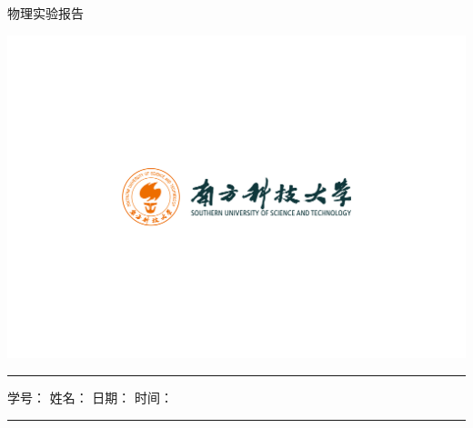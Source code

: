 \documentclass[12pt,a4paper]{article}
\begin{document}
	\doublespacing
	
	
	\noindent
	\hspace{-2em}
	\begin{minipage}[c]{0.65\textwidth}
		\raggedright
		{\fontsize{40pt}{60pt}\selectfont 物理实验报告}
	\end{minipage}
	\begin{minipage}[c]{0.35\textwidth}
		\raggedleft
		\includegraphics[width=\linewidth, trim={20cm 20cm 20cm 20cm}, clip]{university_logo.png}
	\end{minipage}

	\vspace{-1em}
	

	
	\hrule
	\vspace{0.4em}
	\hspace{-2.2em}
	\noindent
	学号：\underline{} \quad
	姓名：\underline{} \quad
	日期：\underline{} \quad
	时间：\underline{}
	\vspace{-1em}
	\par
	\hrule
	
\end{document}
